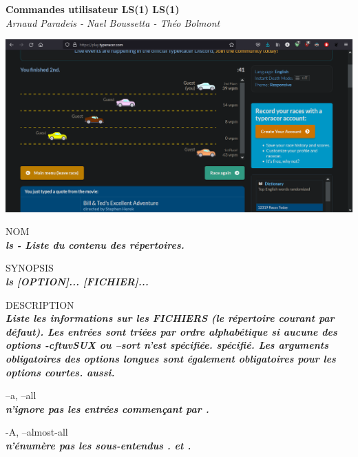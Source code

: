 \documentclass{article}
\begin{document}
\begin{center}
\huge  \textbf{Commandes utilisateur LS(1) LS(1)} \\

\normalsize \textit {Arnaud Paradeis - Nael Boussetta - Théo Bolmont}\\[4cm]
\end{center}
\includegraphics[scale=0.5]{image/typing.PNG}










\par NOM\\
		\textit{\textbf{ls - Liste du contenu des répertoires.}}\\
\par SYNOPSIS\\
		\textit{\textbf{ls [OPTION]... [FICHIER]...}}\\
\par DESCRIPTION\\
		\textit{\textbf{Liste les informations sur les FICHIERS (le répertoire courant par défaut).
       Les entrées sont triées par ordre alphabétique si aucune des options -cftuvSUX ou --sort n'est spécifiée.
       spécifié. Les arguments obligatoires des options longues sont également obligatoires pour les options courtes.
       aussi.}}\\

\par --a, --all\\
		\textit{\textbf{n'ignore pas les entrées commençant par .}}\\

\par -A, --almost-all\\
		\textit{\textbf{n'énumère pas les sous-entendus . et .}}\\
\end{document}
